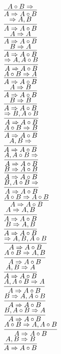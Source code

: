 \documentclass[11pt]{article}
\begin{document}
\begin{center}
\bigskip
\\$\infer{A\Rightarrow A\circ B}{A\circ B\Rightarrow }$
\bigskip
\\$\infer{A\Rightarrow A\circ B}{\Rightarrow A, B}$
\bigskip
\\$\infer{A\Rightarrow A\circ B}{A\Rightarrow A}$
\bigskip
\\$\infer{A\Rightarrow A\circ B}{B\Rightarrow A}$
\bigskip
\\$\infer{A\Rightarrow A\circ B}{\Rightarrow A, A\circ B}$
\bigskip
\\$\infer{A\Rightarrow A\circ B}{A\circ B\Rightarrow A}$
\bigskip
\\$\infer{A\Rightarrow A\circ B}{A\Rightarrow B}$
\bigskip
\\$\infer{A\Rightarrow A\circ B}{B\Rightarrow B}$
\bigskip
\\$\infer{A\Rightarrow A\circ B}{\Rightarrow B, A\circ B}$
\bigskip
\\$\infer{A\Rightarrow A\circ B}{A\circ B\Rightarrow B}$
\bigskip
\\$\infer{A\Rightarrow A\circ B}{A, B\Rightarrow }$
\bigskip
\\$\infer{A\Rightarrow A\circ B}{A, A\circ B\Rightarrow }$
\bigskip
\\$\infer{A\Rightarrow A\circ B}{B\Rightarrow A\circ B}$
\bigskip
\\$\infer{A\Rightarrow A\circ B}{B, A\circ B\Rightarrow }$
\bigskip
\\$\infer{A\Rightarrow A\circ B}{A\circ B\Rightarrow A\circ B}$
\bigskip
\\$\infer{A\Rightarrow A\circ B}{A\Rightarrow A, B}$
\bigskip
\\$\infer{A\Rightarrow A\circ B}{B\Rightarrow A, B}$
\bigskip
\\$\infer{A\Rightarrow A\circ B}{\Rightarrow A, B, A\circ B}$
\bigskip
\\$\infer{A\Rightarrow A\circ B}{A\circ B\Rightarrow A, B}$
\bigskip
\\$\infer{A\Rightarrow A\circ B}{A, B\Rightarrow A}$
\bigskip
\\$\infer{A\Rightarrow A\circ B}{A, A\circ B\Rightarrow A}$
\bigskip
\\$\infer{A\Rightarrow A\circ B}{B\Rightarrow A, A\circ B}$
\bigskip
\\$\infer{A\Rightarrow A\circ B}{B, A\circ B\Rightarrow A}$
\bigskip
\\$\infer{A\Rightarrow A\circ B}{A\circ B\Rightarrow A, A\circ B}$
\bigskip
\\$\infer{A\Rightarrow A\circ B}{A, B\Rightarrow B}$

\end{center}
\end{document}
